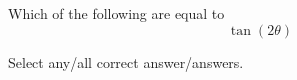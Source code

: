\documentclass{ximera}
\author{Bobby Ramsey}
\begin{document}
\begin{exercise}

	Which of the following are equal to \[ \tan(2\theta) \]
	
	Select any/all correct answer/answers.
	\begin{selectAll}
	\end{selectAll}
	
\end{exercise}
\end{document}

